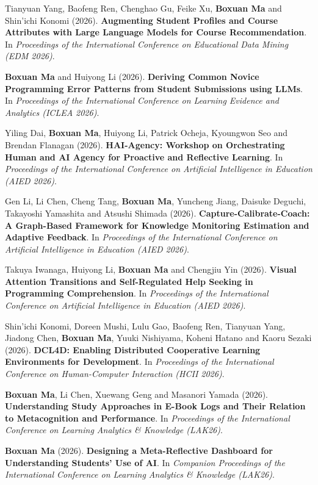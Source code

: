 \documentclass[a4paper,11pt]{article}
\begin{document}
\item[\textbf{[C.39]}] Tianyuan Yang, Baofeng Ren, Chenghao Gu, Feike Xu, \textbf{Boxuan Ma} and Shin'ichi Konomi (2026). \textbf{Augmenting Student Profiles and Course Attributes with Large Language Models for Course Recommendation}. In \textit{Proceedings of the International Conference on Educational Data Mining (EDM 2026)}.
\item[\textbf{[C.38]}] \textbf{Boxuan Ma} and Huiyong Li (2026). \textbf{Deriving Common Novice Programming Error Patterns from Student Submissions using LLMs}. In \textit{Proceedings of the International Conference on Learning Evidence and Analytics (ICLEA 2026)}.
\item[\textbf{[C.37]}] Yiling Dai, \textbf{Boxuan Ma}, Huiyong Li, Patrick Ocheja, Kyoungwon Seo and Brendan Flanagan (2026). \textbf{HAI-Agency: Workshop on Orchestrating Human and AI Agency for Proactive and Reflective Learning}. In \textit{Proceedings of the International Conference on Artificial Intelligence in Education (AIED 2026)}.
\item[\textbf{[C.36]}] Gen Li, Li Chen, Cheng Tang, \textbf{Boxuan Ma}, Yuncheng Jiang, Daisuke Deguchi, Takayoshi Yamashita and Atsushi Shimada (2026). \textbf{Capture-Calibrate-Coach: A Graph-Based Framework for Knowledge Monitoring Estimation and Adaptive Feedback}. In \textit{Proceedings of the International Conference on Artificial Intelligence in Education (AIED 2026)}.
\item[\textbf{[C.35]}] Takuya Iwanaga, Huiyong Li, \textbf{Boxuan Ma} and Chengjiu Yin (2026). \textbf{Visual Attention Transitions and Self-Regulated Help Seeking in Programming Comprehension}. In \textit{Proceedings of the International Conference on Artificial Intelligence in Education (AIED 2026)}.
\item[\textbf{[C.34]}] Shin'ichi Konomi, Doreen Mushi, Lulu Gao, Baofeng Ren, Tianyuan Yang, Jiadong Chen, \textbf{Boxuan Ma}, Yuuki Nishiyama, Koheni Hatano and Kaoru Sezaki (2026). \textbf{DCL4D: Enabling Distributed Cooperative Learning Environments for Development}. In \textit{Proceedings of the International Conference on Human-Computer Interaction (HCII 2026)}.
\item[\textbf{[C.33]}] \textbf{Boxuan Ma}, Li Chen, Xuewang Geng and Masanori Yamada (2026). \textbf{Understanding Study Approaches in E-Book Logs and Their Relation to Metacognition and Performance}. In \textit{Proceedings of the International Conference on Learning Analytics \& Knowledge (LAK26)}.
\item[\textbf{[C.32]}] \textbf{Boxuan Ma} (2026). \textbf{Designing a Meta-Reflective Dashboard for Understanding Students' Use of AI}. In \textit{Companion Proceedings of the International Conference on Learning Analytics \& Knowledge (LAK26)}.
\end{document}
